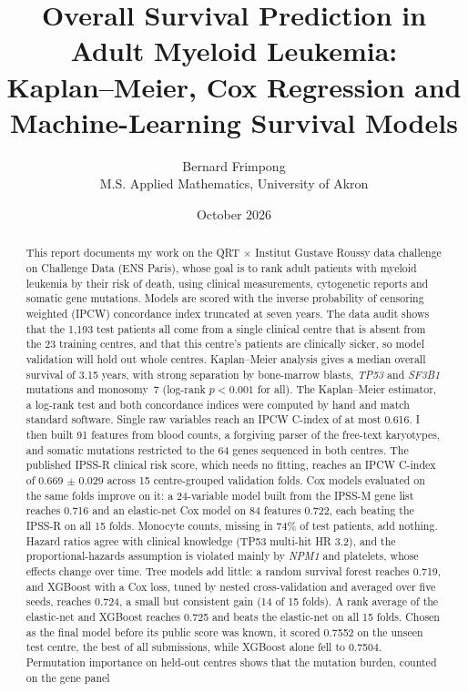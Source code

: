 \documentclass[11pt,a4paper]{article}
\title{Overall Survival Prediction in Adult Myeloid Leukemia:\\
Kaplan--Meier, Cox Regression and Machine-Learning Survival Models}
\author{Bernard Frimpong\\
\small M.S. Applied Mathematics, University of Akron}
\date{October 2026}
\begin{document}
\maketitle

\begin{abstract}
This report documents my work on the QRT $\times$ Institut Gustave Roussy data
challenge on Challenge Data (ENS Paris), whose goal is to rank adult patients with
myeloid leukemia by their risk of death, using clinical measurements, cytogenetic
reports and somatic gene mutations. Models are scored with the inverse probability
of censoring weighted (IPCW) concordance index truncated at seven years. The data
audit shows that the 1{,}193 test patients all come from a single clinical centre that
is absent from the 23 training centres, and that this centre's patients are clinically
sicker, so model validation will hold out whole centres. Kaplan--Meier analysis gives a
median overall survival of 3.15 years, with strong separation by bone-marrow blasts,
\textit{TP53} and \textit{SF3B1} mutations and monosomy~7 (log-rank $p<0.001$ for all).
The Kaplan--Meier estimator, a log-rank test and both concordance indices were computed
by hand and match standard software. Single raw variables reach an IPCW C-index of at
most 0.616. I then built 91 features from blood counts, a forgiving parser of the
free-text karyotypes, and somatic mutations restricted to the 64 genes sequenced in both
centres. The published IPSS-R clinical risk score, which needs no fitting, reaches an
IPCW C-index of 0.669 $\pm$ 0.029 across 15 centre-grouped validation folds. Cox models
evaluated on the same folds improve on it: a 24-variable model built from the IPSS-M
gene list reaches 0.716 and an elastic-net Cox model on 84 features 0.722, each beating
the IPSS-R on all 15 folds. Monocyte counts, missing in 74\% of test patients, add
nothing. Hazard ratios agree with clinical knowledge (TP53 multi-hit HR 3.2), and the
proportional-hazards assumption is violated mainly by \textit{NPM1} and platelets, whose
effects change over time. Tree models add little: a random survival forest reaches 0.719,
and XGBoost with a Cox loss, tuned by nested cross-validation and averaged over five
seeds, reaches 0.724, a small but consistent gain (14 of 15 folds). A rank average of the
elastic-net and XGBoost reaches 0.725 and beats the elastic-net on all 15 folds. Chosen
as the final model before its public score was known, it scored 0.7552 on the unseen
test centre, the best of all submissions, while XGBoost alone fell to 0.7504. Permutation
importance on held-out centres shows that the mutation burden, counted on the gene panel

\end{abstract}
\end{document}
